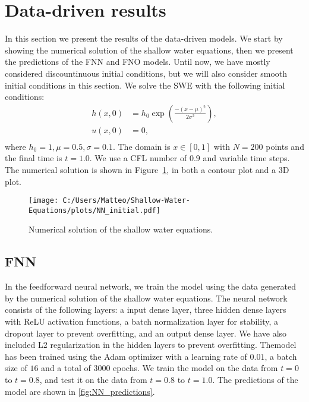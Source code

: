 \section{Data-driven results}
In this section we present the results of the data-driven models.
We start by showing the numerical solution of the shallow water equations, then we present the predictions of the FNN and FNO models.
Until now, we have mostly considered discountinuous initial conditions, but we will also consider smooth initial conditions in this section.
We solve the SWE with the following initial conditions:
\begin{equation}
    \begin{aligned}
        h(x, 0) &= h_0 \exp \left( \frac{-{(x-\mu)}^2}{2 \sigma^2} \right) ,\\
        u(x, 0) &= 0 , \\
    \end{aligned}
\end{equation}
where $h_0 = 1, \mu = 0.5, \sigma = 0.1$. 
The domain is $ x \in [0, 1]$ with $N = 200$ points and the final time is $t = 1.0$.
We use a CFL number of $0.9$ and variable time steps.
The numerical solution is shown in Figure~\ref{fig:NN_initial}, in both a contour plot and a 3D plot.
\begin{figure}[H]
    \centering
    \texttt{[image: C:/Users/Matteo/Shallow-Water-Equations/plots/NN\_initial.pdf]}
    \caption{Numerical solution of the shallow water equations.}\label{fig:NN_initial}
\end{figure}


\subsection{FNN}
In the feedforward neural network, we train the model using the data generated by the numerical solution of the shallow water equations.
The neural network consists of the following layers: a input dense layer, three hidden dense layers with ReLU activation functions, a batch normalization layer for stability, a dropout layer to prevent overfitting, and an output dense layer.
We have also included L2 regularization in the hidden layers to prevent overfitting.
Themodel has been trained using the Adam optimizer with a learning rate of $0.01$, a batch size of $16$ and a total of $3000$ epochs.
We train the model on the data from $t = 0$ to $t = 0.8$, and test it on the data from $t = 0.8$ to $t = 1.0$.
The predictions of the model are shown in \autoref{fig:NN_predictions}.

